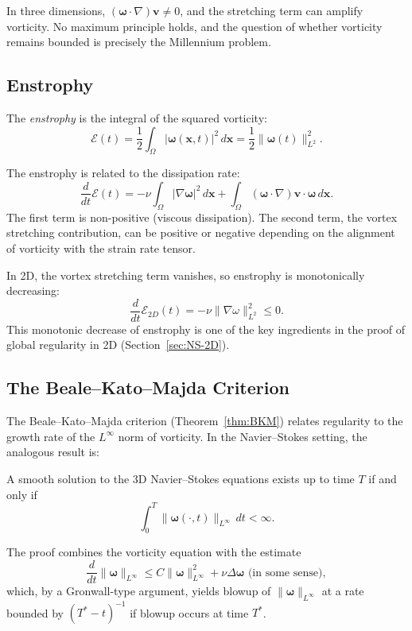 In three dimensions, $(\boldsymbol{\omega} \cdot \nabla)\mathbf{v} \ne 0$, and the stretching term can amplify vorticity. No maximum principle holds, and the question of whether vorticity remains bounded is precisely the Millennium problem.

\subsection{Enstrophy}

\begin{definition}
The \textit{enstrophy} is the integral of the squared vorticity:
\[
\mathcal{E}(t) = \frac{1}{2} \int_\Omega |\boldsymbol{\omega}(\mathbf{x}, t)|^2 \, d\mathbf{x} = \frac{1}{2} \|\boldsymbol{\omega}(t)\|_{L^2}^2.
\]
\end{definition}

The enstrophy is related to the dissipation rate:
\[
\frac{d}{dt} \mathcal{E}(t) = -\nu \int_\Omega |\nabla \boldsymbol{\omega}|^2 \, d\mathbf{x} + \int_\Omega (\boldsymbol{\omega} \cdot \nabla)\mathbf{v} \cdot \boldsymbol{\omega} \, d\mathbf{x}.
\]
The first term is non-positive (viscous dissipation). The second term, the vortex stretching contribution, can be positive or negative depending on the alignment of vorticity with the strain rate tensor.

In 2D, the vortex stretching term vanishes, so enstrophy is monotonically decreasing:
\[
\frac{d}{dt} \mathcal{E}_{2D}(t) = -\nu \|\nabla \omega\|_{L^2}^2 \le 0.
\]
This monotonic decrease of enstrophy is one of the key ingredients in the proof of global regularity in 2D (Section~\ref{sec:NS-2D}).

\subsection{The Beale--Kato--Majda Criterion}

The Beale--Kato--Majda criterion (Theorem~\ref{thm:BKM}) relates regularity to the growth rate of the $L^\infty$ norm of vorticity. In the Navier--Stokes setting, the analogous result is:

\begin{theorem}
A smooth solution to the 3D Navier--Stokes equations exists up to time $T$ if and only if
\[
\int_0^T \|\boldsymbol{\omega}(\cdot, t)\|_{L^\infty} \, dt < \infty.
\]
\end{theorem}

The proof combines the vorticity equation with the estimate
\[
\frac{d}{dt} \|\boldsymbol{\omega}\|_{L^\infty} \le C \|\boldsymbol{\omega}\|_{L^\infty}^2 + \nu \Delta \boldsymbol{\omega} \text{ (in some sense)},
\]
which, by a Gronwall-type argument, yields blowup of $\|\boldsymbol{\omega}\|_{L^\infty}$ at a rate bounded by $(T^* - t)^{-1}$ if blowup occurs at time $T^*$.

